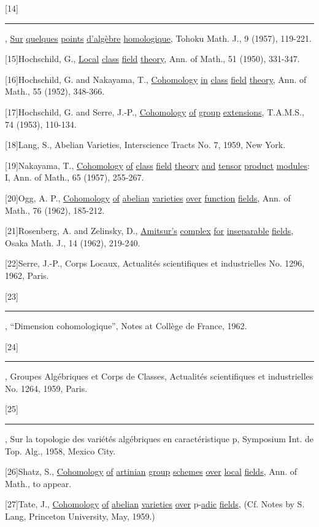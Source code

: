 [14]\quad \rule{4.7em}{.4pt}, \uline{Sur} \uline{quelques} \uline{points} \uline{d'algèbre} \uline{homologique}, Tohoku Math. J., 9 (1957), 119-221.

[15]\quad Hochschild, G., \uline{Local} \uline{class} \uline{field} \uline{theory}, Ann. of Math., 51 (1950), 331-347.

[16]\quad Hochschild, G. and Nakayama, T., \uline{Cohomology} \uline{in} \uline{class} \uline{field} \uline{theory}, Ann. of Math., 55 (1952), 348-366.

[17]\quad Hochschild, G. and Serre, J.-P., \uline{Cohomology} \uline{of} \uline{group} \uline{extensions}, T.A.M.S., 74 (1953), 110-134.

[18]\quad Lang, S., Abelian Varieties, Interscience Tracts No. 7, 1959, New York.

[19]\quad Nakayama, T., \uline{Cohomology} \uline{of} \uline{class} \uline{field} \uline{theory} \uline{and} \uline{tensor} \uline{product} \uline{modules}: I, Ann. of Math., 65 (1957), 255-267.

[20]\quad Ogg, A. P., \uline{Cohomology} \uline{of} \uline{abelian} \uline{varieties} \uline{over} \uline{function} \uline{fields}, Ann. of Math., 76 (1962), 185-212.

[21]\quad Rosenberg, A. and Zelinsky, D., \uline{Amitsur's} \uline{complex} \uline{for} \uline{inseparable} \uline{fields}, Osaka Math. J., 14 (1962), 219-240.

[22]\quad Serre, J.-P., Corps Locaux, Actualités scientifiques et industrielles No. 1296, 1962, Paris.

[23]\quad \rule{4.7em}{.4pt}, \textquotedblleft Dimension cohomologique\textquotedblright, Notes at Collège de France, 1962.

[24]\quad \rule{4.7em}{.4pt}, Groupes Algébriques et Corps de Classes, Actualités scientifiques et industrielles No. 1264, 1959, Paris.

[25]\quad \rule{4.7em}{.4pt}, Sur la topologie des variétés algébriques en caractéristique p, Symposium Int. de Top. Alg., 1958, Mexico City.

[26]\quad Shatz, S., \uline{Cohomology} \uline{of} \uline{artinian} \uline{group} \uline{schemes} \uline{over} \uline{local} \uline{fields}, Ann. of Math., to appear.

[27]\quad Tate, J., \uline{Cohomology} \uline{of} \uline{abelian} \uline{varieties} \uline{over} p-\uline{adic} \uline{fields}, (Cf. Notes by S. Lang, Princeton University, May, 1959.)
